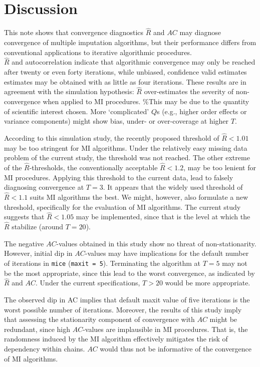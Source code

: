 \documentclass[
  Royal, times, sageapa]{sagej}
\begin{document}
\hypertarget{discussion}{%
\section{Discussion}\label{discussion}}

This note shows that convergence diagnostics \(\widehat{R}\) and \(AC\)
may diagnose convergence of multiple imputation algorithms, but their
performance differs from conventional applications to iterative
algorithmic procedures.\\
\(\widehat{R}\) and autocorrelation indicate that algorithmic
convergence may only be reached after twenty or even forty iterations,
while unbiased, confidence valid estimates estimates may be obtained
with as little as four iterations. These results are in agreement with
the simulation hypothesis: \(\widehat{R}\) over-estimates the severity
of non-convergence when applied to MI procedures. \%This may be due to
the quantity of scientific interest chosen. More `complicated' \(Q\)s
(e.g., higher order effects or variance components) might show bias,
under- or over-coverage at higher \(T\).

According to this simulation study, the recently proposed threshold of
\(\widehat{R}<1.01\) may be too stringent for MI algorithms. Under the
relatively easy missing data problem of the current study, the threshold
was not reached. The other extreme of the \(\widehat{R}\)-thresholds,
the conventionally acceptable \(\widehat{R} <1.2\), may be too lenient
for MI procedures. Applying this threshold to the current data, lead to
falsely diagnosing convergence at \(T = 3\). It appears that the widely
used threshold of \(\widehat{R} < 1.1\) suits MI algorithms the best. We
might, however, also formulate a new threshold, specifically for the
evaluation of MI algorithms. The current study suggests that
\(\widehat{R} < 1.05\) may be implemented, since that is the level at
which the \(\widehat{R}\) stabilize (around \(T = 20\)).

The negative \(AC\)-values obtained in this study show no threat of
non-stationarity. However, initial dip in \(AC\)-values may have
implications for the default number of iterations in \texttt{mice}
(\texttt{maxit\ =\ 5}). Terminating the algorithm at \(T=5\) may not be
the most appropriate, since this lead to the worst convergence, as
indicated by \(\widehat{R}\) and \(AC\). Under the current
specifications, \(T>20\) would be more appropriate.

The observed dip in AC implies that default maxit value of five
iterations is the worst possible number of iterations. Moreover, the
results of this study imply that assessing the stationarity component of
convergence with \(AC\) might be redundant, since high \(AC\)-values are
implausible in MI procedures. That is, the randomness induced by the MI
algorithm effectively mitigates the risk of dependency within chains.
\(AC\) would thus not be informative of the convergence of MI
algorithms.
\end{document}
